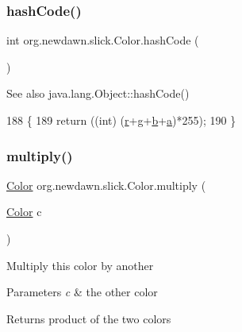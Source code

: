 \subsubsection{\texorpdfstring{hash\+Code()}{hashCode()}}
{\footnotesize\ttfamily int org.\+newdawn.\+slick.\+Color.\+hash\+Code (\begin{DoxyParamCaption}{ }\end{DoxyParamCaption})\hspace{0.3cm}{\ttfamily [inline]}}

\begin{DoxySeeAlso}{See also}
java.\+lang.\+Object\+::hash\+Code() 
\end{DoxySeeAlso}

\begin{DoxyCode}
188                           \{
189         \textcolor{keywordflow}{return} ((\textcolor{keywordtype}{int}) (\mbox{\hyperlink{classorg_1_1newdawn_1_1slick_1_1_color_ac07fa95108064b044dcf9a53e95dcb48}{r}}+\mbox{\hyperlink{classorg_1_1newdawn_1_1slick_1_1_color_aa6ebff7c102a1476e7b511a78397b753}{g}}+\mbox{\hyperlink{classorg_1_1newdawn_1_1slick_1_1_color_a8c0cef152e16438fee852a97e50ef7a5}{b}}+\mbox{\hyperlink{classorg_1_1newdawn_1_1slick_1_1_color_ab9288c822ff7614a77c887eb8c2595a7}{a}})*255);
190     \}
\end{DoxyCode}
\mbox{\label{classorg_1_1newdawn_1_1slick_1_1_color_a7531e1b247c0d75639790cbb84867a39}} 
\subsubsection{\texorpdfstring{multiply()}{multiply()}}
{\footnotesize\ttfamily \mbox{\hyperlink{classorg_1_1newdawn_1_1slick_1_1_color}{Color}} org.\+newdawn.\+slick.\+Color.\+multiply (\begin{DoxyParamCaption}\item[{\mbox{\hyperlink{classorg_1_1newdawn_1_1slick_1_1_color}{Color}}}]{c }\end{DoxyParamCaption})\hspace{0.3cm}{\ttfamily [inline]}}

Multiply this color by another


\begin{DoxyParams}{Parameters}
{\em c} & the other color \\
\hline
\end{DoxyParams}
\begin{DoxyReturn}{Returns}
product of the two colors 
\end{DoxyReturn}

